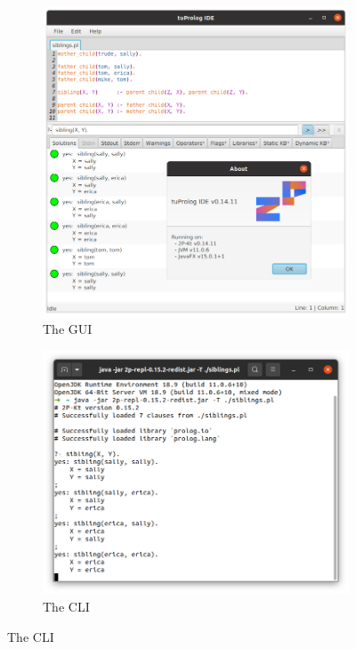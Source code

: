 \documentclass[12pt,a4paper,openright,twoside]{book}
\begin{document}
\begin{figure}\centering
    \begin{subfigure}{.49\linewidth}
        \includegraphics[width=\linewidth]{figures/2p-ide-all.png}
        \caption{The \twopkt{} GUI}
        \label{fig:gui}
    \end{subfigure}
    \hfill
    \begin{subfigure}{.49\linewidth}
        \includegraphics[width=\linewidth]{figures/2p-kt-repl.png}
        \caption{The \twopkt{} CLI}
        \label{fig:cli}
    \end{subfigure}


\end{figure}
\end{document}
